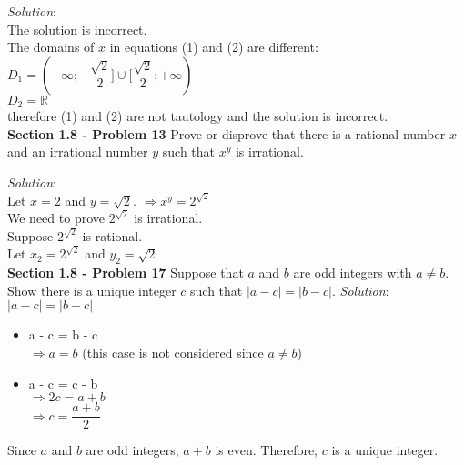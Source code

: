 \documentclass[10pt]{article}
\begin{document}
\bigbreak
\textit{Solution}: \\
    The solution is incorrect. \\
    The domains of $x$ in equations (1) and (2) are different: \\
    $D_{1} = (-\infty; -\dfrac{\sqrt{2}}{2}] \cup [\dfrac{\sqrt{2}}{2}; +\infty)$ \\
    $D_{2} = \mathbb{R}$ \\
    therefore (1) and (2) are not tautology and the solution is incorrect. \\

\clearpage
\textbf{Section 1.8 - Problem 13} Prove or disprove that there is a rational number
$x$ and an irrational number $y$ such that $x^{y}$ is irrational.

\bigbreak
\textit{Solution}: \\
    Let $x = 2$ and $y = \sqrt{2}$.
    $\Rightarrow x^{y} = 2^{\sqrt{2}}$ \\
    We need to prove $2^{\sqrt{2}}$ is irrational. \\

    Suppose $2^{\sqrt{2}}$ is rational. \\
    Let $x_{2} = 2^{\sqrt{2}}$ and $y_{2} = \sqrt{2}$ \\

\clearpage
\textbf{Section 1.8 - Problem 17} Suppose that $a$ and $b$ are odd integers with
$a \neq b$. Show there is a unique integer $c$ such that $|a - c| = |b - c|$.
\bigbreak
\textit{Solution}: \\
    $|a - c| = |b - c|$
    \begin{itemize}
        \item a - c = b - c \\
            $\Rightarrow a = b$ (this case is not considered since $a \neq b$) \\
        \item a - c = c - b \\
            $\Rightarrow 2c = a + b$ \\
            $\Rightarrow c = \dfrac{a + b}{2}$
    \end{itemize}
    Since $a$ and $b$ are odd integers, $a + b$ is even. Therefore, $c$ is a unique integer.
\end{document}
